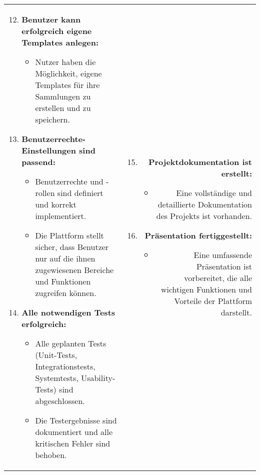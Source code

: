     \begin{tabularx}{\textwidth}{L R}
        \begin{enumerate}[left=0pt,label=\arabic*.,itemsep=0.4cm]
            \setcounter{enumi}{11}
            \small
            \item \textbf{Benutzer kann erfolgreich eigene Templates anlegen:}
            \begin{itemize}[leftmargin=*]
                \item Nutzer haben die Möglichkeit, eigene Templates für ihre Sammlungen zu erstellen und zu speichern.
            \end{itemize}

            \item \textbf{Benutzerrechte-Einstellungen sind passend:}
            \begin{itemize}[leftmargin=*]
                \item Benutzerrechte und -rollen sind definiert und korrekt implementiert.
                \item Die Plattform stellt sicher, dass Benutzer nur auf die ihnen zugewiesenen Bereiche und Funktionen zugreifen können.
            \end{itemize}

            \item \textbf{Alle notwendigen Tests erfolgreich:}
            \begin{itemize}[leftmargin=*]
                \item Alle geplanten Tests (Unit-Tests, Integrationstests, Systemtests, Usability-Tests) sind abgeschlossen.
                \item Die Testergebnisse sind dokumentiert und alle kritischen Fehler sind behoben.
            \end{itemize}

        \end{enumerate}
        &
        \begin{enumerate}[left=0pt,label=\arabic*.,itemsep=0.4cm]
            \setcounter{enumi}{14}
            \small
            \item \textbf{Projektdokumentation ist erstellt:}
            \begin{itemize}[leftmargin=*]
                \item Eine vollständige und detaillierte Dokumentation des Projekts ist vorhanden.
            \end{itemize}

            \item \textbf{Präsentation fertiggestellt:}
            \begin{itemize}[leftmargin=*]
                \item Eine umfassende Präsentation ist vorbereitet, die alle wichtigen Funktionen und Vorteile der Plattform darstellt.
            \end{itemize}


\end{enumerate}
\end{tabularx}
